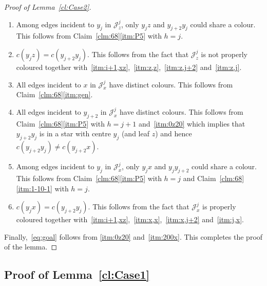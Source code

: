 \documentclass[a4paper, 12pt]{article}
\numberwithin{equation}{section}
\newcommand{\ms}[1]{\mathscr{#1}}
\begin{document}
\begin{proof}[Proof of Lemma~\ref{cl:Case2}]
\begin{enumerate}[label = {\rm(f$_{\arabic*}$)}]
\item\label{itm:z,j}
Among edges incident to $y_j$ in $\ms{J}^j_z$, only $y_jz$ and $y_{j+2}y_j$ could share a colour.
This follows from Claim~\ref{clm:68}\ref{itm:P5} with $h=j$.

\item\label{itm:0z20} %
$c(y_jz) = c(y_{j+2}y_j)$.
This follows from the fact that $\ms{J}^j_z$ is not properly coloured together with~\ref{itm:i+1,xz},~\ref{itm:z,z},~\ref{itm:z,j+2} and~\ref{itm:z,j}.





\item\label{itm:x,x} %
All edges incident to $x$ in $\ms{J}_x^j$ have distinct colours.
This follows from Claim~\ref{clm:68}\ref{itm:gen}.



\item\label{itm:x,j+2} %
All edges incident to $y_{j+2}$ in $\ms{J}^j_x$ have distinct colours.
This follows from Claim~\ref{clm:68}\ref{itm:P5} with $h=j+1$ and~\ref{itm:0z20} which implies that $y_{j+2}y_j$ is in a star with centre $y_j$ (and leaf $z$) and hence $c(y_{j+2}y_j) \neq c(y_{j+2}x)$.


\item\label{itm:j,x} %
Among edges incident to $y_j$ in $\ms{J}_x^j$, only $y_{j}x$ and $y_{j}y_{j+2}$ could share a colour.
This follows from Claim~\ref{clm:68}\ref{itm:P5} with $h=j$ and Claim~\ref{clm:68}\ref{itm:1-10-1} with $h=j$.


\item\label{itm:200x}
$c(y_jx) = c(y_{j+2}y_j)$.
This follows from the fact that $\ms{J}^j_x$ is properly coloured together with~\ref{itm:i+1,xz},~\ref{itm:x,x},~\ref{itm:x,j+2} and~\ref{itm:j,x}.
\end{enumerate}

Finally,~\eqref{eq:goal} follows from \ref{itm:0z20} and~\ref{itm:200x}.
This completes the proof of the lemma.
\end{proof}





\subsection{Proof of Lemma~\ref{cl:Case1}}
\end{document}

